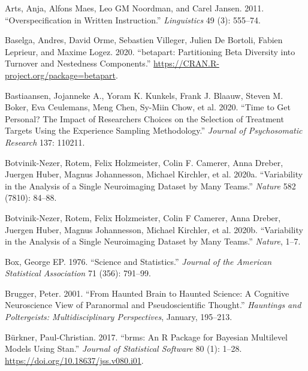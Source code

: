 \documentclass[
  12pt,
]{article}
\newlength{\cslhangindent}
\newenvironment{CSLReferences}[2] %
 {%
  \setlength{\parindent}{0pt}
  \ifodd #1 \everypar{\setlength{\hangindent}{\cslhangindent}}\ignorespaces\fi
  \ifnum #2 > 0
  \setlength{\parskip}{#2\baselineskip}
  \fi
 }%
 {}
\begin{document}
\hypertarget{refs}{}
\begin{CSLReferences}{1}{0}
\leavevmode{}%
Arts, Anja, Alfons Maes, Leo GM Noordman, and Carel Jansen. 2011. {``Overspecification in Written Instruction.''} \emph{Linguistics} 49 (3): 555--74.

\leavevmode{}%
Baselga, Andres, David Orme, Sebastien Villeger, Julien De Bortoli, Fabien Leprieur, and Maxime Logez. 2020. {``{b}etapart: Partitioning Beta Diversity into Turnover and Nestedness Components.''} \url{https://CRAN.R-project.org/package=betapart}.

\leavevmode{}%
Bastiaansen, Jojanneke A., Yoram K. Kunkels, Frank J. Blaauw, Steven M. Boker, Eva Ceulemans, Meng Chen, Sy-Miin Chow, et al. 2020. {``Time to Get Personal? The Impact of Researchers Choices on the Selection of Treatment Targets Using the Experience Sampling Methodology.''} \emph{Journal of Psychosomatic Research} 137: 110211.

\leavevmode{}%
Botvinik-Nezer, Rotem, Felix Holzmeister, Colin F. Camerer, Anna Dreber, Juergen Huber, Magnus Johannesson, Michael Kirchler, et al. 2020a. {``Variability in the Analysis of a Single Neuroimaging Dataset by Many Teams.''} \emph{Nature} 582 (7810): 84--88.

\leavevmode{}%
Botvinik-Nezer, Rotem, Felix Holzmeister, Colin F Camerer, Anna Dreber, Juergen Huber, Magnus Johannesson, Michael Kirchler, et al. 2020b. {``Variability in the Analysis of a Single Neuroimaging Dataset by Many Teams.''} \emph{Nature}, 1--7.

\leavevmode{}%
Box, George EP. 1976. {``Science and Statistics.''} \emph{Journal of the American Statistical Association} 71 (356): 791--99.

\leavevmode{}%
Brugger, Peter. 2001. {``From Haunted Brain to Haunted Science: A Cognitive Neuroscience View of Paranormal and Pseudoscientific Thought.''} \emph{Hauntings and Poltergeists: Multidisciplinary Perspectives}, January, 195--213.

\leavevmode{}%
Bürkner, Paul-Christian. 2017. {``{brms}: An {R} Package for {Bayesian} Multilevel Models Using {Stan}.''} \emph{Journal of Statistical Software} 80 (1): 1--28. \url{https://doi.org/10.18637/jss.v080.i01}.


\end{CSLReferences}
\end{document}
